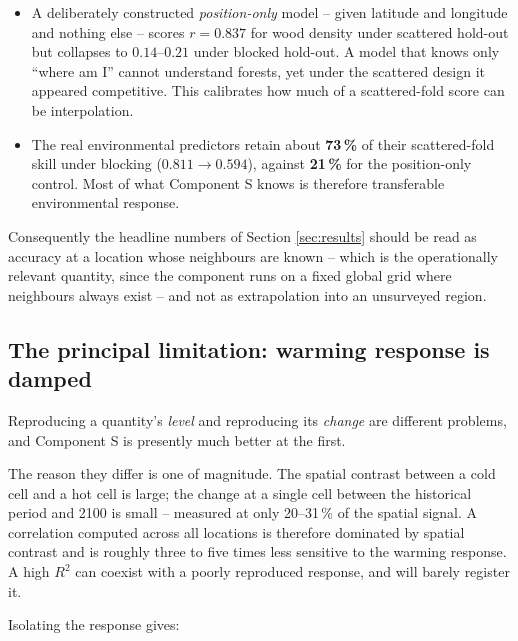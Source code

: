 \documentclass[11pt]{article}
\begin{document}
\begin{itemize}[leftmargin=1.4em]
\item A deliberately constructed \emph{position-only} model -- given latitude and longitude and nothing else -- scores $r = 0.837$ for wood density under scattered hold-out but collapses to $0.14$--$0.21$ under blocked hold-out. A model that knows only ``where am I'' cannot understand forests, yet under the scattered design it appeared competitive. This calibrates how much of a scattered-fold score can be interpolation.
\item The real environmental predictors retain about \textbf{73\,\%} of their scattered-fold skill under blocking ($0.811 \rightarrow 0.594$), against \textbf{21\,\%} for the position-only control. Most of what Component S knows is therefore transferable environmental response.
\end{itemize}

Consequently the headline numbers of Section \ref{sec:results} should be read as accuracy at a location whose neighbours are known -- which is the operationally relevant quantity, since the component runs on a fixed global grid where neighbours always exist -- and not as extrapolation into an unsurveyed region.

\subsection{The principal limitation: warming response is damped}
\label{sec:damping}

Reproducing a quantity's \emph{level} and reproducing its \emph{change} are different problems, and Component S is presently much better at the first.

The reason they differ is one of magnitude. The spatial contrast between a cold cell and a hot cell is large; the change at a single cell between the historical period and 2100 is small -- measured at only 20--31\,\% of the spatial signal. A correlation computed across all locations is therefore dominated by spatial contrast and is roughly three to five times less sensitive to the warming response. A high $R^2$ can coexist with a poorly reproduced response, and will barely register it.

Isolating the response gives:
\end{document}
